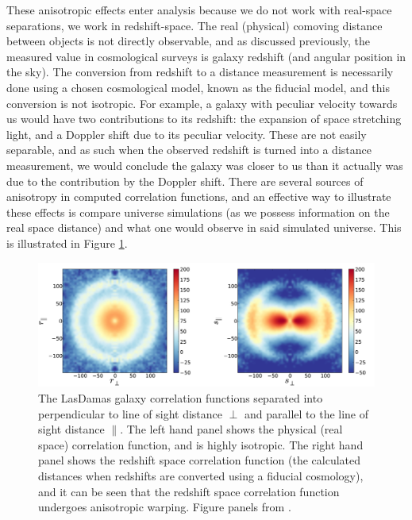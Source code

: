 \documentclass[titlesmallcaps, examinerscopy, copyrightpage]{uqthesis}
\begin{document}
These anisotropic effects enter analysis because we do not work with real-space separations, we work in redshift-space. The real (physical) comoving distance between objects is not directly observable, and as discussed previously, the measured value in cosmological surveys is galaxy redshift (and angular position in the sky). The conversion from redshift to a distance measurement is necessarily done using a chosen cosmological model, known as the fiducial model, and this conversion is not isotropic. For example, a galaxy with peculiar velocity towards us would have two contributions to its redshift: the expansion of space stretching light, and a Doppler shift due to its peculiar velocity. These are not easily separable, and as such when the observed redshift is turned into a distance measurement, we would conclude the galaxy was closer to us than it actually was due to the contribution by the Doppler shift. There are several sources of anisotropy in computed correlation functions, and an effective way to illustrate these effects is compare universe simulations (as we possess information on the real space distance) and what one would observe in said simulated universe. This is illustrated  in Figure \ref{fig:ani}.

\begin{figure}[h!]
  \begin{center}
    \includegraphics[width=\textwidth]{images/anisotropies.jpg}
  \end{center}
  \caption{The LasDamas galaxy correlation functions separated into perpendicular to line of sight distance $\perp$ and parallel to the line of sight distance $\parallel$. The left hand panel shows the physical (real space) correlation function, and is highly isotropic. The right hand panel shows the redshift space correlation function (the calculated distances when redshifts are converted using a fiducial cosmology), and it can be seen that the redshift space correlation function undergoes anisotropic warping. Figure panels from \citet{PadmanabhanXuEisenstein2012}.}
  \label{fig:ani}
\end{figure}
\end{document}
